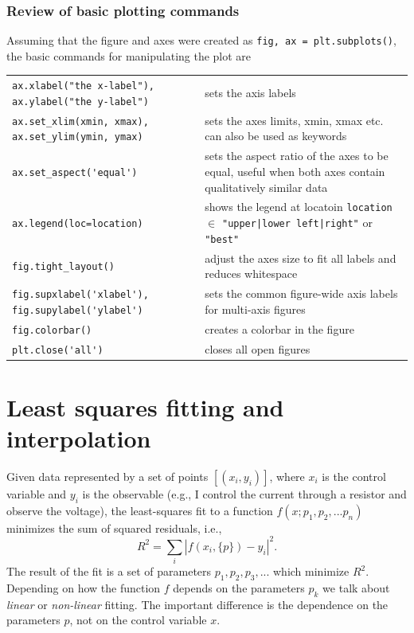 \documentclass{article}
\newcommand{\ls}[1]{\lstinline{#1}}
\begin{document}
\subsubsection{Review of basic plotting commands}
Assuming that the figure and axes were created as \ls{fig, ax = plt.subplots()}, the basic commands for manipulating the plot are

\begin{tabular}{p{40mm}p{100mm}}
     \ls{ax.xlabel("the x-label"), ax.ylabel("the y-label")} & sets the axis labels \\
     \ls{ax.set_xlim(xmin, xmax), ax.set_ylim(ymin, ymax)} & sets the axes limits, xmin, xmax etc. can also be used as keywords \\
     \ls{ax.set_aspect('equal')} & sets the aspect ratio of the axes to be equal, useful when both axes contain qualitatively similar data\\
     \ls{ax.legend(loc=location)} & shows the legend at locatoin \ls{location} $\in$ \ls{"upper|lower left|right"} or \ls{"best"} \\
     \ls{fig.tight_layout()} & adjust the axes size to fit all labels and reduces whitespace\\
     \ls{fig.supxlabel('xlabel'), fig.supylabel('ylabel')} & sets the common figure-wide axis labels for multi-axis figures\\
     \ls{fig.colorbar()} & creates a colorbar in the figure\\
     \ls{plt.close('all')} & closes all open figures
\end{tabular}

\newpage
\section{Least squares fitting and interpolation}
Given data represented by a set of points $[(x_i, y_i)]$, where $x_i$ is the control variable and $y_i$ is the observable (e.g., I control the current through a resistor and observe the voltage), the least-squares fit to a function $f(x; p_1, p_2, ... p_n)$ minimizes the sum of squared residuals, i.e.,
\begin{equation}
    R^2 = \sum_i \left|f(x_i, \{p\}) - y_i\right|^2.
\end{equation}
The result of the fit is a set of parameters $p_1, p_2, p_3, ...$ which minimize $R^2$. Depending on how the function $f$ depends on the parameters $p_k$ we talk about \emph{linear} or \emph{non-linear} fitting. The important difference is the dependence on the parameters $p$, not on the control variable $x$. 
\end{document}
